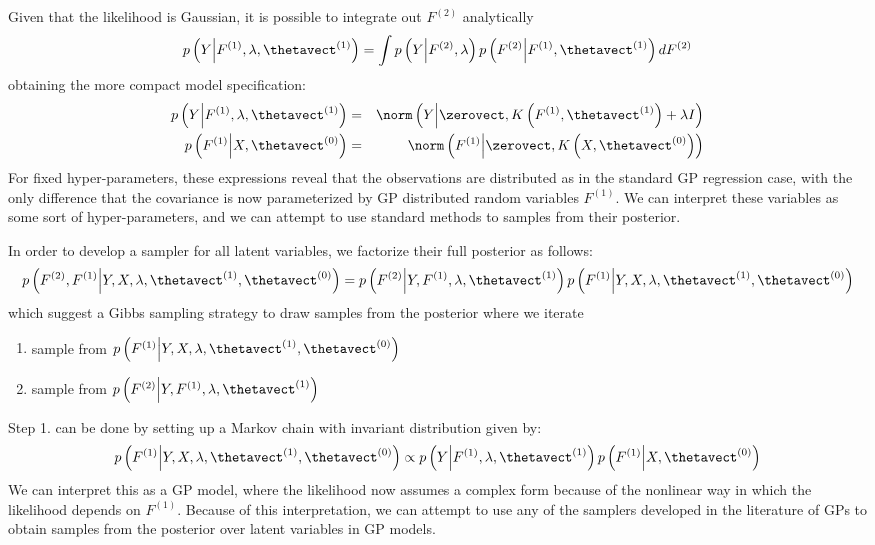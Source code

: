 Given that the likelihood is Gaussian, it is possible to integrate out $F^{(2)}$ analytically
$$
p\left(Y \middle| F^{(1)}, \lambda, \thetavect^{(1)}\right) = \int p\left(Y \middle| F^{(2)}, \lambda\right) p\left(F^{(2)} \middle| F^{(1)}, \thetavect^{(1)}\right) dF^{(2)}
$$
obtaining the more compact model specification:
\begin{eqnarray}
p\left(Y \middle| F^{(1)}, \lambda, \thetavect^{(1)}\right) & = & \norm\left( Y \middle| \zerovect, K\left(F^{(1)}, \thetavect^{(1)}\right) + \lambda I \right) \nonumber \\
p\left(F^{(1)} \middle| X, \thetavect^{(0)}\right) & = & \norm\left( F^{(1)} \middle| \zerovect, K\left(X, \thetavect^{(0)}\right) \right)  \nonumber
\end{eqnarray}
For fixed hyper-parameters, these expressions reveal that the observations are distributed as in the standard GP regression case, with the only difference that the covariance is now parameterized by GP distributed random variables $F^{(1)}$. 
We can interpret these variables as some sort of hyper-parameters, and we can attempt to use standard \mcmc methods to samples from their posterior.

In order to develop a sampler for all latent variables, we factorize their full posterior as follows:
$$
p\left(F^{(2)}, F^{(1)} \middle| Y, X, \lambda, \thetavect^{(1)}, \thetavect^{(0)}\right) = 
p\left(F^{(2)} \middle| Y, F^{(1)}, \lambda, \thetavect^{(1)}\right) p\left(F^{(1)} \middle| Y, X, \lambda, \thetavect^{(1)}, \thetavect^{(0)}\right)
$$
which suggest a Gibbs sampling strategy to draw samples from the posterior where we iterate
\begin{enumerate}
	\item 
	sample from 
	$
	p\left(F^{(1)} \middle| Y, X, \lambda, \thetavect^{(1)}, \thetavect^{(0)}\right)
	$
	\item
	sample from 
	$
	p\left(F^{(2)} \middle| Y, F^{(1)}, \lambda, \thetavect^{(1)}\right)
	$
\end{enumerate}

Step 1. can be done by setting up a Markov chain with invariant distribution given by:
$$
p\left(F^{(1)} \middle| Y, X, \lambda, \thetavect^{(1)}, \thetavect^{(0)}\right) \propto p\left(Y \middle| F^{(1)}, \lambda, \thetavect^{(1)}\right) p\left(F^{(1)} \middle| X, \thetavect^{(0)}\right)
$$
We can interpret this as a GP model, where the likelihood now assumes a complex form because of the nonlinear way in which the likelihood depends on $F^{(1)}$.
Because of this interpretation, we can attempt to use any of the samplers developed in the literature of GPs to obtain samples from the posterior over latent variables in GP models.

